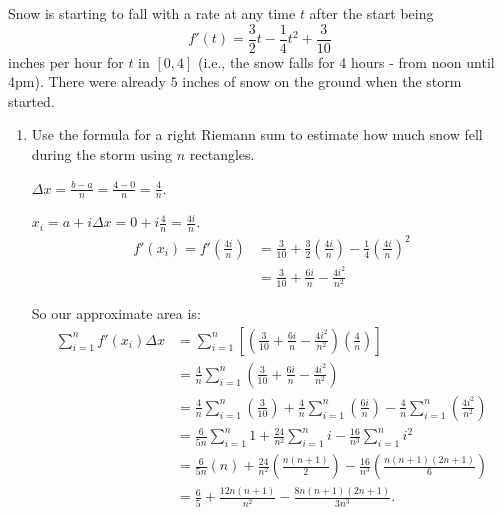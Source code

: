 \documentclass[handout,nooutcomes]{ximera}
\begin{document}
\begin{problem}
Snow is starting to fall with a rate at any time $t$ after the start being 
$$ f'(t) = \frac{3}{2} t - \frac{1}{4} t^2 + \frac{3}{10} $$
inches per hour for $t$ in $[0,4]$ (i.e., the snow falls for 4 hours - from noon until 4pm).  
There were already $5$ inches of snow on the ground when the storm started.  
	\begin{enumerate}
	
	\item  Use the formula for a right Riemann sum to estimate how much snow fell during the storm using $n$ rectangles.
		\begin{freeResponse}
		$\Delta x = \frac{b-a}{n} = \frac{4-0}{n} = \frac{4}{n}$.
		
		$x_i = a + i \Delta x = 0 + i \frac{4}{n} = \frac{4i}{n}$.
			\begin{align*}
			f'(x_i) = f' \left( \frac{4i}{n} \right) &= \frac{3}{10} + \frac{3}{2} \left( \frac{4i}{n} \right) - \frac{1}{4} \left( \frac{4i}{n} \right)^2  \\
			&= \frac{3}{10} + \frac{6i}{n} - \frac{4i^2}{n^2}
			\end{align*}
			
		So our approximate area is:
			\begin{align*}
			\sum_{i=1}^n f'(x_i) \Delta x &= \sum_{i=1}^n \left[ \left( \frac{3}{10} + \frac{6i}{n} - \frac{4i^2}{n^2} \right) \left( \frac{4}{n} \right) \right]  \\
			&= \frac{4}{n} \sum_{i=1}^n \left( \frac{3}{10} + \frac{6i}{n} - \frac{4i^2}{n^2} \right)  \\
			&= \frac{4}{n} \sum_{i=1}^n \left( \frac{3}{10} \right) + \frac{4}{n} \sum_{i=1}^n \left( \frac{6i}{n} \right) - \frac{4}{n} \sum_{i=1}^n \left( \frac{4i^2}{n^2} \right)  \\
			&= \frac{6}{5n} \sum_{i=1}^n 1 + \frac{24}{n^2} \sum_{i=1}^n i - \frac{16}{n^3} \sum_{i=1}^n i^2  \\
			&= \frac{6}{5n} (n) + \frac{24}{n^2} \left( \frac{n(n+1)}{2} \right) - \frac{16}{n^3} \left( \frac{n(n+1)(2n+1)}{6} \right)  \\
			&= \frac{6}{5} + \frac{12n(n+1)}{n^2} - \frac{8n(n+1)(2n+1)}{3n^3}.
			\end{align*}
		\end{freeResponse}
		
		
		

\end{enumerate}
\end{problem}
\end{document}

